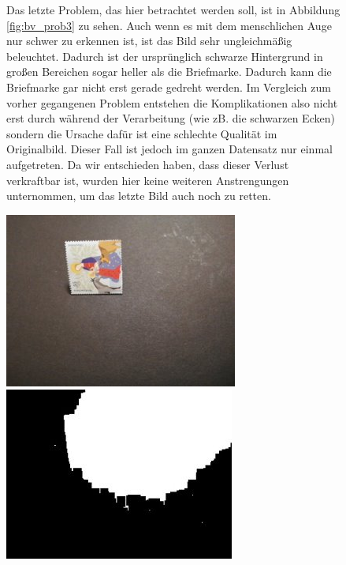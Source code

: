 \documentclass[12pt,toc=bib,toc=listof]{scrreprt}
\begin{document}
\begin{figure}[h]
\begin{minipage}[t]{.75\linewidth}

Das letzte Problem, das hier betrachtet werden soll, ist in Abbildung \ref{fig:bv_prob3} zu sehen. Auch wenn es mit dem menschlichen Auge nur schwer zu erkennen ist, ist das Bild sehr ungleichmäßig beleuchtet. Dadurch ist der ursprünglich schwarze Hintergrund in großen Bereichen sogar heller als die Briefmarke. Dadurch kann die Briefmarke gar nicht erst gerade gedreht werden. Im Vergleich zum vorher gegangenen Problem entstehen die Komplikationen also nicht erst durch während der Verarbeitung (wie zB. die schwarzen Ecken) sondern die Ursache dafür ist eine schlechte Qualität im Originalbild. Dieser Fall ist jedoch im ganzen Datensatz nur einmal aufgetreten.  Da wir entschieden haben, dass dieser Verlust verkraftbar ist, wurden hier keine weiteren Anstrengungen unternommen, um das letzte Bild auch noch zu retten.
\end{minipage}
\hfill
\begin{minipage}[t]{.2\linewidth}
  \strut\vspace*{-\baselineskip}\newline\includegraphics[width=\linewidth]{./bilder/prob3_pic}
  \includegraphics[width=\linewidth]{./bilder/prob3_bad_bin}

\end{minipage}
\end{figure}
\end{document}
